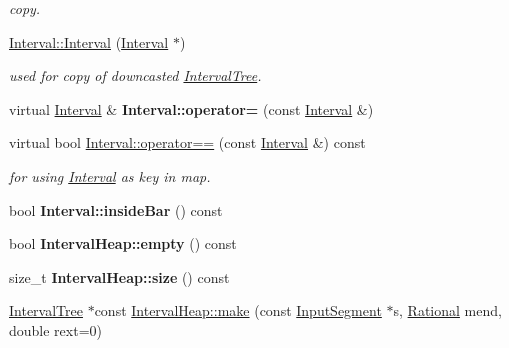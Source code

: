 \begin{DoxyCompactItemize}
\begin{DoxyCompactList}\small\item\em copy. \end{DoxyCompactList}\item 
\mbox{\label{group__segment_ga43e7da7f24dfa17fccdd0dd40a96f458}} 
\mbox{\hyperlink{group__segment_ga43e7da7f24dfa17fccdd0dd40a96f458}{Interval\+::\+Interval}} (\mbox{\hyperlink{classInterval}{Interval}} $\ast$)
\begin{DoxyCompactList}\small\item\em used for copy of downcasted \mbox{\hyperlink{classIntervalTree}{Interval\+Tree}}. \end{DoxyCompactList}\item 
\mbox{\label{group__segment_ga6508f58e15c54be6146d5505d91a4b91}} 
virtual \mbox{\hyperlink{classInterval}{Interval}} \& {\bfseries Interval\+::operator=} (const \mbox{\hyperlink{classInterval}{Interval}} \&)
\item 
\mbox{\label{group__segment_ga4b0896bf3843fec18d68a130fe9a49f6}} 
virtual bool \mbox{\hyperlink{group__segment_ga4b0896bf3843fec18d68a130fe9a49f6}{Interval\+::operator==}} (const \mbox{\hyperlink{classInterval}{Interval}} \&) const
\begin{DoxyCompactList}\small\item\em for using \mbox{\hyperlink{classInterval}{Interval}} as key in map. \end{DoxyCompactList}\item 
\mbox{\label{group__segment_ga3af4cc83b5ee3d320fa5b24fa244fabb}} 
bool {\bfseries Interval\+::inside\+Bar} () const
\item 
\mbox{\label{group__segment_ga4a873d9f7d804928f972a3c11d2a1df0}} 
bool {\bfseries Interval\+Heap\+::empty} () const
\item 
\mbox{\label{group__segment_ga87e6be639c7435053444d83913505c1b}} 
size\+\_\+t {\bfseries Interval\+Heap\+::size} () const
\item 
\mbox{\hyperlink{classIntervalTree}{Interval\+Tree}} $\ast$const \mbox{\hyperlink{group__segment_gad7fd7dd4ddb8d520df0985e67d180019}{Interval\+Heap\+::make}} (const \mbox{\hyperlink{classInputSegment}{Input\+Segment}} $\ast$s, \mbox{\hyperlink{classRational}{Rational}} mend, double rext=0)

\end{DoxyCompactItemize}
